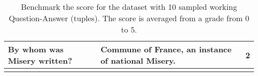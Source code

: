 \begin{landscape}
\begin{longtable}[c]{@{}llc@{}}
By whom was Misery written?                                      & Commune of France, an instance of national Misery.                                  & 2                                                     \\* \bottomrule
\caption{Benchmark the score for the dataset with 10 sampled working Question-Answer (tuples). The score is averaged from a grade from 0 to 5.}
\label{tab:results-benchmark-nl-questions}\\
\end{longtable}
\end{landscape}





